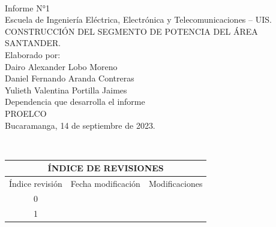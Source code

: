 \documentclass[12pt]{article}
\begin{document}
\begin{center}
\phantom{This text will be invisible} \\
\vspace{1.5cm}
Informe N°1\\
Escuela de Ingeniería Eléctrica, Electrónica y Telecomunicaciones – UIS.\\
\vspace{4cm}
CONSTRUCCIÓN DEL SEGMENTO DE POTENCIA DEL ÁREA SANTANDER.\\
\vspace{4cm}
Elaborado por:\\
Dairo Alexander Lobo Moreno\\
Daniel Fernando Aranda Contreras\\
Yulieth Valentina Portilla Jaimes\\

\vspace{4cm}
Dependencia que desarrolla el informe\\
PROELCO\\
Bucaramanga, 14 de septiembre de 2023.\\
\vspace{2cm}
\end{center}
\newpage
\phantom{This text will be invisible} \\

\begin{table}[h]
\centering
\begin{tabular}{|ccc|}
\hline
\multicolumn{3}{|c|}{ÍNDICE DE REVISIONES}                                                                \\ \hline
\multicolumn{1}{|c|}{Índice revisión} & \multicolumn{1}{c|}{Fecha modificación} & Modificaciones \\ \hline
\multicolumn{1}{|c|}{0}               & \multicolumn{1}{c|}{}                   &                \\ \hline
\multicolumn{1}{|c|}{1}               & \multicolumn{1}{c|}{}                   &                \\ \hline
\end{tabular}
\end{table}
\end{document}
